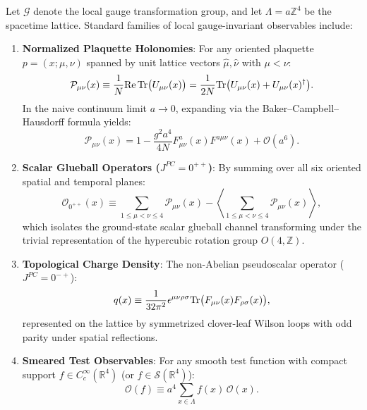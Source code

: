 Let $\mathcal{G}$ denote the local gauge transformation group, and let $\Lambda = a \mathbb{Z}^4$ be the spacetime lattice. Standard families of local gauge-invariant observables include:
\begin{enumerate}
    \item \textbf{Normalized Plaquette Holonomies}: For any oriented plaquette $p = (x; \mu, \nu)$ spanned by unit lattice vectors $\hat{\mu}, \hat{\nu}$ with $\mu < \nu$:
    \begin{equation}
    \label{eq:plaquette_trace_obs}
    \mathcal{P}_{\mu\nu}(x) \equiv \frac{1}{N} \mathrm{Re} \, \mathrm{Tr}\bigl( U_{\mu\nu}(x) \bigr) = \frac{1}{2N} \mathrm{Tr}\bigl( U_{\mu\nu}(x) + U_{\mu\nu}(x)^\dagger \bigr).
    \end{equation}
    In the naive continuum limit $a \to 0$, expanding via the Baker--Campbell--Hausdorff formula yields:
    \begin{equation}
    \mathcal{P}_{\mu\nu}(x) = 1 - \frac{g^2 a^4}{4N} F_{\mu\nu}^a(x) F^{a\mu\nu}(x) + \mathcal{O}(a^6).
    \end{equation}
    
    \item \textbf{Scalar Glueball Operators ($J^{PC} = 0^{++}$)}: By summing over all six oriented spatial and temporal planes:
    \begin{equation}
    \label{eq:scalar_glueball_operator}
    \mathcal{O}_{0^{++}}(x) \equiv \sum_{1 \le \mu < \nu \le 4} \mathcal{P}_{\mu\nu}(x) - \left\langle \sum_{1 \le \mu < \nu \le 4} \mathcal{P}_{\mu\nu}(x) \right\rangle,
    \end{equation}
    which isolates the ground-state scalar glueball channel transforming under the trivial representation of the hypercubic rotation group $O(4, \mathbb{Z})$.
    
    \item \textbf{Topological Charge Density}: The non-Abelian pseudoscalar operator ($J^{PC} = 0^{-+}$):
    \begin{equation}
    \label{eq:topological_charge_density}
    q(x) \equiv \frac{1}{32\pi^2} \epsilon^{\mu\nu\rho\sigma} \mathrm{Tr}\bigl( F_{\mu\nu}(x) F_{\rho\sigma}(x) \bigr),
    \end{equation}
    represented on the lattice by symmetrized clover-leaf Wilson loops with odd parity under spatial reflections.
    
    \item \textbf{Smeared Test Observables}: For any smooth test function with compact support $f \in C_c^\infty(\mathbb{R}^4)$ (or $f \in \mathcal{S}(\mathbb{R}^4)$):
    \begin{equation}
    \label{eq:smeared_observable}
    \mathcal{O}(f) \equiv a^4 \sum_{x \in \Lambda} f(x) \, \mathcal{O}(x).
    \end{equation}
\end{enumerate}

